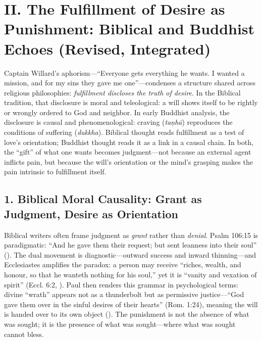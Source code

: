 \section*{II. The Fulfillment of Desire as Punishment: Biblical and Buddhist Echoes (Revised, Integrated)}
\label{sec:ii-the-fulfillment-of-desire-as-punishment-biblical-and-buddhist-echoes-revised-integrated}

Captain Willard's aphorism---``Everyone gets everything he wants. I wanted a mission, and for my sins they gave me one''---condenses a structure shared across religious philosophies: \emph{fulfillment discloses the truth of desire}. In the Biblical tradition, that disclosure is moral and teleological: a will shows itself to be rightly or wrongly ordered to God and neighbor. In early Buddhist analysis, the disclosure is causal and phenomenological: craving (\emph{taṇhā}) reproduces the conditions of suffering (\emph{dukkha}). Biblical thought reads fulfillment as a test of love’s orientation; Buddhist thought reads it as a link in a causal chain. In both, the ``gift'' of what one wants becomes judgment---not because an external agent inflicts pain, but because the will’s orientation or the mind’s grasping makes the pain intrinsic to fulfillment itself.

\subsection*{1. Biblical Moral Causality: Grant as Judgment, Desire as Orientation}
\label{ssec:1-biblical-moral-causality-grant-as-judgment-desire-as-orientation}

Biblical writers often frame judgment as \emph{grant} rather than \emph{denial}. Psalm 106:15 is paradigmatic: ``And he gave them their request; but sent leanness into their soul'' (\parencite{KJV2017}). The dual movement is diagnostic---outward success and inward thinning---and Ecclesiastes amplifies the paradox: a person may receive ``riches, wealth, and honour, so that he wanteth nothing for his soul,'' yet it is ``vanity and vexation of spirit'' (Eccl. 6:2, \parencite{KJV2017}). Paul then renders this grammar in psychological terms: divine ``wrath'' appears not as a thunderbolt but as permissive justice---``God gave them over in the sinful desires of their hearts'' (Rom. 1:24), meaning the will is handed over to its own object (\parencite{FitzmyerRomans1993}). The punishment is not the absence of what was sought; it is the presence of what was sought---where what was sought cannot bless.

